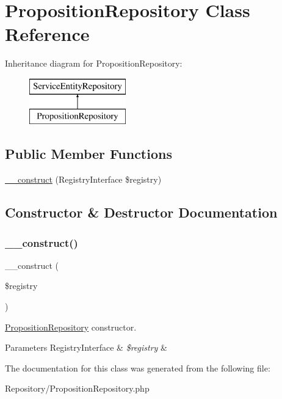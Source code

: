 \hypertarget{class_app_1_1_repository_1_1_proposition_repository}{}\section{Proposition\+Repository Class Reference}
\label{class_app_1_1_repository_1_1_proposition_repository}
Inheritance diagram for Proposition\+Repository\+:\begin{figure}[H]
\begin{center}
\leavevmode
\includegraphics[height=2.000000cm]{class_app_1_1_repository_1_1_proposition_repository}
\end{center}
\end{figure}
\subsection*{Public Member Functions}
\begin{DoxyCompactItemize}
\item 
\mbox{\hyperlink{class_app_1_1_repository_1_1_proposition_repository_aadca7edd263e228921a1860bb6b9c252}{\+\_\+\+\_\+construct}} (Registry\+Interface \$registry)
\end{DoxyCompactItemize}


\subsection{Constructor \& Destructor Documentation}
\mbox{\label{class_app_1_1_repository_1_1_proposition_repository_aadca7edd263e228921a1860bb6b9c252}} 
\subsubsection{\texorpdfstring{\_\_construct()}{\_\_construct()}}
{\footnotesize\ttfamily \+\_\+\+\_\+construct (\begin{DoxyParamCaption}\item[{Registry\+Interface}]{\$registry }\end{DoxyParamCaption})}

\mbox{\hyperlink{class_app_1_1_repository_1_1_proposition_repository}{Proposition\+Repository}} constructor. 
\begin{DoxyParams}[1]{Parameters}
Registry\+Interface & {\em \$registry} & \\
\hline
\end{DoxyParams}


The documentation for this class was generated from the following file\+:\begin{DoxyCompactItemize}
\item 
Repository/Proposition\+Repository.\+php\end{DoxyCompactItemize}
